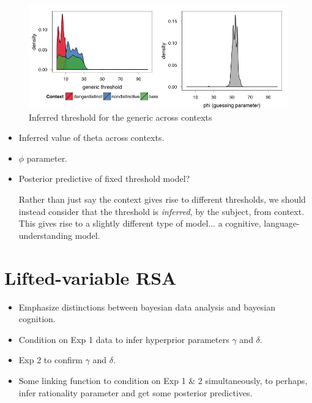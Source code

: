 \documentclass[10pt,letterpaper]{article}
\begin{document}
\begin{figure}
\centering
    \includegraphics[width=\columnwidth]{fig2_bda1_combined}
    \caption{Inferred threshold for the generic across contexts}
  \label{fig:bda1a}
\end{figure}


\begin{itemize}
\item Inferred value of theta across contexts. 
\item $\phi$ parameter. 
\item Posterior predictive of fixed threshold model?

Rather than just say the context gives rise to different thresholds, we should instead consider that the threshold is \emph{inferred}, by the subject, from context. This gives rise to a slightly different type of model... a cognitive, language-understanding model.
\end{itemize}

\section{Lifted-variable RSA}
\begin{itemize}

\item Emphasize distinctions between bayesian data analysis and bayesian cognition. 

\item Condition on Exp 1 data to infer hyperprior parameters $\gamma$ and $\delta$. 

\item Exp 2 to confirm $\gamma$ and $\delta$. 

\item Some linking function to condition on Exp 1 \& 2 simultaneously,  to perhaps, infer rationality parameter and get some posterior predictives.

\end{itemize}
\end{document}

